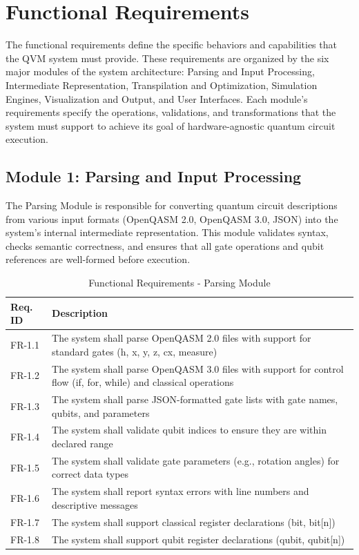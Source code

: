 \section{Functional Requirements}

The functional requirements define the specific behaviors and capabilities that the QVM system must provide. These requirements are organized by the six major modules of the system architecture: Parsing and Input Processing, Intermediate Representation, Transpilation and Optimization, Simulation Engines, Visualization and Output, and User Interfaces. Each module's requirements specify the operations, validations, and transformations that the system must support to achieve its goal of hardware-agnostic quantum circuit execution.

\subsection{Module 1: Parsing and Input Processing}

The Parsing Module is responsible for converting quantum circuit descriptions from various input formats (OpenQASM 2.0, OpenQASM 3.0, JSON) into the system's internal intermediate representation. This module validates syntax, checks semantic correctness, and ensures that all gate operations and qubit references are well-formed before execution.

\begin{table}[H]
\centering
\caption{Functional Requirements - Parsing Module}
\begin{tabular}{|p{2cm}|p{11cm}|}
\hline
\textbf{Req. ID} & \textbf{Description} \\
\hline
FR-1.1 & The system shall parse OpenQASM 2.0 files with support for standard gates (h, x, y, z, cx, measure) \\
\hline
FR-1.2 & The system shall parse OpenQASM 3.0 files with support for control flow (if, for, while) and classical operations \\
\hline
FR-1.3 & The system shall parse JSON-formatted gate lists with gate names, qubits, and parameters \\
\hline
FR-1.4 & The system shall validate qubit indices to ensure they are within declared range \\
\hline
FR-1.5 & The system shall validate gate parameters (e.g., rotation angles) for correct data types \\
\hline
FR-1.6 & The system shall report syntax errors with line numbers and descriptive messages \\
\hline
FR-1.7 & The system shall support classical register declarations (bit, bit[n]) \\
\hline
FR-1.8 & The system shall support qubit register declarations (qubit, qubit[n]) \\
\hline
\end{tabular}
\end{table}

